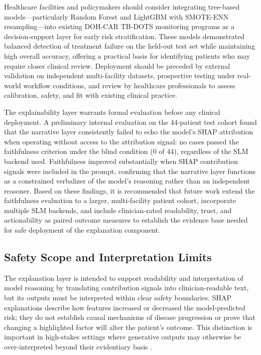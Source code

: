 \documentclass[12pt]{article}
\begin{document}
Healthcare facilities and policymakers should consider integrating tree-based models---particularly Random Forest and LightGBM with SMOTE-ENN resampling---into existing DOH-CAR TB-DOTS monitoring programs as a decision-support layer for early risk stratification. These models demonstrated balanced detection of treatment failure on the held-out test set while maintaining high overall accuracy, offering a practical basis for identifying patients who may require closer clinical review. Deployment should be preceded by external validation on independent multi-facility datasets, prospective testing under real-world workflow conditions, and review by healthcare professionals to assess calibration, safety, and fit with existing clinical practice.

The explainability layer warrants formal evaluation before any clinical deployment. A preliminary internal evaluation on the 44-patient test cohort found that the narrative layer consistently failed to echo the model's SHAP attribution when operating without access to the attribution signal: no cases passed the faithfulness criterion under the blind condition (0 of 44), regardless of the SLM backend used. Faithfulness improved substantially when SHAP contribution signals were included in the prompt, confirming that the narrative layer functions as a constrained verbalizer of the model's reasoning rather than an independent reasoner. Based on these findings, it is recommended that future work extend the faithfulness evaluation to a larger, multi-facility patient cohort, incorporate multiple SLM backends, and include clinician-rated readability, trust, and actionability as paired outcome measures to establish the evidence base needed for safe deployment of the explanation component.

\subsection{Safety Scope and Interpretation Limits}

The explanation layer is intended to support readability and interpretation of model reasoning by translating contribution signals into clinician-readable text, but its outputs must be interpreted within clear safety boundaries. SHAP explanations describe how features increased or decreased the model-predicted risk; they do not establish causal mechanisms of disease progression or prove that changing a highlighted factor will alter the patient's outcome. This distinction is important in high-stakes settings where generative outputs may otherwise be over-interpreted beyond their evidentiary basis \citep{ref42, ref43}.
\end{document}

